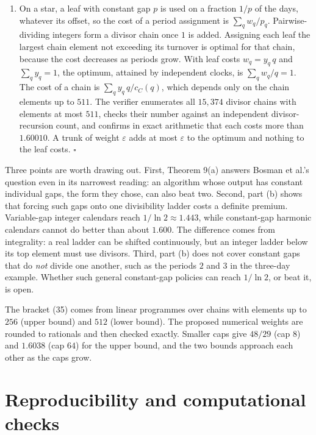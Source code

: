 \documentclass[
  british,
  11pt,
  a4paper,
]{article}
\providecommand{\tightlist}{%
  \setlength{\itemsep}{0pt}\setlength{\parskip}{0pt}}
\begin{document}
\begin{enumerate}
\def\labelenumi{(\alph{enumi})}
\setcounter{enumi}{1}
\tightlist
\item
  On a star, a leaf with constant gap \(p\) is used on a fraction
  \(1/p\) of the days, whatever its offset, so the cost of a period
  assignment is \(\sum_qw_q/p_q\). Pairwise-dividing integers form a
  divisor chain once \(1\) is added. Assigning each leaf the largest
  chain element not exceeding its turnover is optimal for that chain,
  because the cost decreases as periods grow. With leaf costs
  \(w_q=y_q\,q\) and \(\sum_qy_q=1\), the optimum, attained by
  independent clocks, is \(\sum_qw_q/q=1\). The cost of a chain is
  \(\sum_qy_q\,q/c_C(q)\), which depends only on the chain elements up
  to \(511\). The verifier enumerates all \(15{,}374\) divisor chains
  with elements at most \(511\), checks their number against an
  independent divisor-recursion count, and confirms in exact arithmetic
  that each costs more than \(1.60010\). A trunk of weight
  \(\varepsilon\) adds at most \(\varepsilon\) to the optimum and
  nothing to the leaf costs. \(\square\)
\end{enumerate}

Three points are worth drawing out. First, Theorem 9(a) answers Bosman
et al.'s question even in its narrowest reading: an algorithm whose
output has constant individual gaps, the form they chose, can also beat
two. Second, part (b) shows that forcing such gaps onto one divisibility
ladder costs a definite premium. Variable-gap integer calendars reach
\(1/\ln2\approx1.443\), while constant-gap harmonic calendars cannot do
better than about \(1.600\). The difference comes from integrality: a
real ladder can be shifted continuously, but an integer ladder below its
top element must use divisors. Third, part (b) does not cover constant
gaps that do \emph{not} divide one another, such as the periods \(2\)
and \(3\) in the three-day example. Whether such general constant-gap
policies can reach \(1/\ln2\), or beat it, is open.

The bracket (35) comes from linear programmes over chains with elements
up to \(256\) (upper bound) and \(512\) (lower bound). The proposed
numerical weights are rounded to rationals and then checked exactly.
Smaller caps give \(48/29\) (cap \(8\)) and \(1.6038\) (cap \(64\)) for
the upper bound, and the two bounds approach each other as the caps
grow.

\section{Reproducibility and computational
checks}\label{reproducibility-and-computational-checks}
\end{document}
